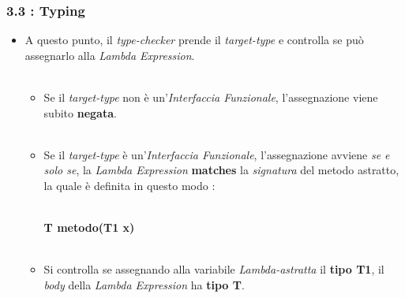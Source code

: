\documentclass{beamer}
\begin{document}

\begin{frame}
	\frametitle{\textbf{3.3 : Typing}}
	\begin{itemize}
		\item
			A questo punto, il \textit{type-checker} prende il \textit{target-type} e controlla se può assegnarlo alla \textit{Lambda Expression}.\\\
			\begin{itemize}
				\item
					Se il \textit{target-type} non è un'\textit{Interfaccia Funzionale}, l'assegnazione viene subito \textbf{negata}.\\\
				\item
					Se il \textit{target-type} è un'\textit{Interfaccia Funzionale}, l'assegnazione avviene \textit{se e solo se}, la \textit{Lambda Expression} \textbf{matches} la \textit{signatura} del metodo astratto, la quale è definita in questo modo :\\\
					\begin{center}
						\textbf{T metodo(T1 x)}\\\
					\end{center}
				\item
					Si controlla se assegnando alla variabile \textit{Lambda-astratta} il \textbf{tipo T1}, il \textit{body} della \textit{Lambda Expression} ha \textbf{tipo T}.
			\end{itemize}
	\end{itemize}
\end{frame}

\end{document}
